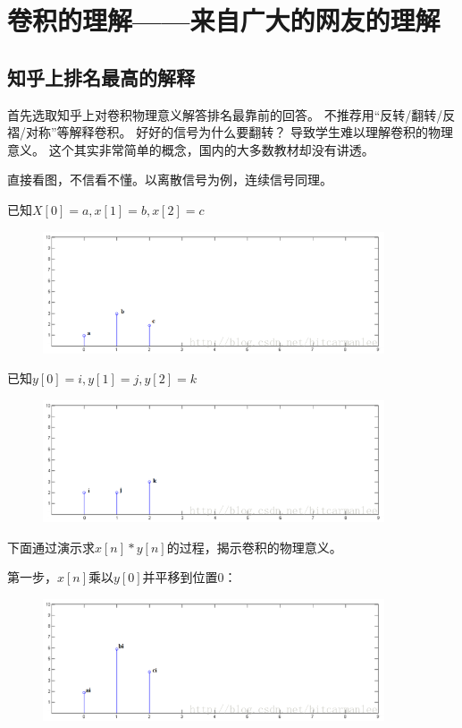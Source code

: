 \section{卷积的理解------来自广大的网友的理解}
\subsection{知乎上排名最高的解释}
首先选取知乎上对卷积物理意义解答排名最靠前的回答。%
不推荐用“反转/翻转/反褶/对称”等解释卷积。%
好好的信号为什么要翻转？%
导致学生难以理解卷积的物理意义。%
这个其实非常简单的概念，国内的大多数教材却没有讲透。%

直接看图，不信看不懂。以离散信号为例，连续信号同理。%

已知$X[0] = a, x[1] = b, x[2] = c$
\begin{figure}[hpbt]
  \centering
  \includegraphics[width=0.9\textwidth]{图像及其数学与物理背景/Figures/卷积x}
\end{figure}

已知$y[0] = i, y[1] = j, y[2] = k$
\begin{figure}[hpbt]
  \centering
  \includegraphics[width=0.9\textwidth]{图像及其数学与物理背景/Figures/卷积y}
\end{figure}

下面通过演示求$x[n] * y[n]$的过程，揭示卷积的物理意义。

第一步，$x[n]$乘以$y[0]$并平移到位置0：
\begin{figure}[hpbt]
  \centering
  \includegraphics[width=0.9\textwidth]{图像及其数学与物理背景/Figures/卷积1}
\end{figure}

